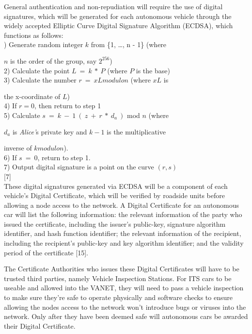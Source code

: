 \documentclass[conference,compsoc]{IEEEtran}
\begin{document}
General authentication and non-repudiation will require the use of digital signatures, which will be generated for each autonomous vehicle through the widely accepted Elliptic Curve Digital Signature Algorithm (ECDSA), which functions as follows:\\
) Generate random integer $k$ from \{1, …, n - 1\} (where

$n$ is the order of the group, say $2^{256}$)\\
2) Calculate the point $L~ =~ k~ *~ P$ (where $P$ is the base)\\
3) Calculate the number $r~ = ~xL modulo n$ (where $xL$ is 

the x-coordinate of $L$)\\
4) If $r = 0$, then return to step 1\\
5) Calculate $s ~= ~k~-~1~(~z ~+~ r~ *~ d_a~)$ mod $n$ (where 

$d_a$ is \emph{Alice'}s private key and $k-1$ is the multiplicative 

inverse of $k modulo n$).\\
6) If $s ~=~ 0$, return to step 1.\\
7) Output digital signature is a point on the curve $(r, s)$\\

\hfill{[7]}\\

These digital signatures generated via ECDSA will be a component of each vehicle’s Digital Certificate, which will be verified by roadside units before allowing a node access to the network. A Digital Certificate for an autonomous car will list the following information: the relevant information of the party who issued the certificate, including the issuer’s public-key, signature algorithm identifier, and hash function identifier; the relevant information of the recipient, including the recipient's public-key and key algorithm identifier; and the validity period of the certificate [15]. 

The Certificate Authorities who issues these Digital Certificates will have to be trusted third parties, namely Vehicle Inspection Stations. For ITS cars to be useable and allowed into the VANET, they will need to pass a vehicle inspection to make sure they’re safe to operate physically and software checks to ensure allowing the nodes access to the network won’t introduce bugs or viruses into the network. Only after they have been deemed safe will autonomous cars be awarded their Digital Certificate.
\end{document}
